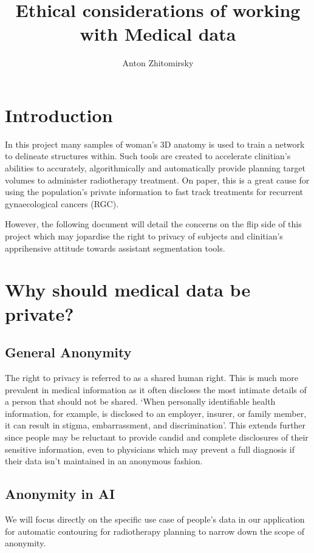 \documentclass[11pt]{article}
\title{Ethical considerations of working with Medical data}
\author{Anton Zhitomirsky}
\begin{document}
\maketitle

\section{Introduction}

In this project many samples of woman's 3D anatomy is used to train a network to delineate structures within. Such tools are created to accelerate clinitian's abilities to accurately, algorithmically and automatically provide planning target volumes to administer radiotherapy treatment. On paper, this is a great cause for using the population's private information to fast track treatments for recurrent gynaecological cancers (RGC).

However, the following document will detail the concerns on the flip side of this project which may jopardise the right to privacy of subjects and clinitian's apprihensive attitude towards assistant segmentation tools.

\section{Why should medical data be private?}

\subsection{General Anonymity}

The right to privacy is referred to as a shared human right. This is much more prevalent in medical information as it often discloses the most intimate details of a person that should not be shared. `When personally identifiable health information, for example, is disclosed to an employer, insurer, or family member, it can result in stigma, embarrassment, and discrimination'\cite{health-privacy}. This extends further since people may be reluctant to provide candid and complete disclosures of their sensitive information, even to physicians which may prevent a full diagnosis if their data isn't maintained in an anonymous fashion.

\subsection{Anonymity in AI}

We will focus directly on the specific use case of people's data in our application for automatic contouring for radiotherapy planning to narrow down the scope of anonymity.
\end{document}
